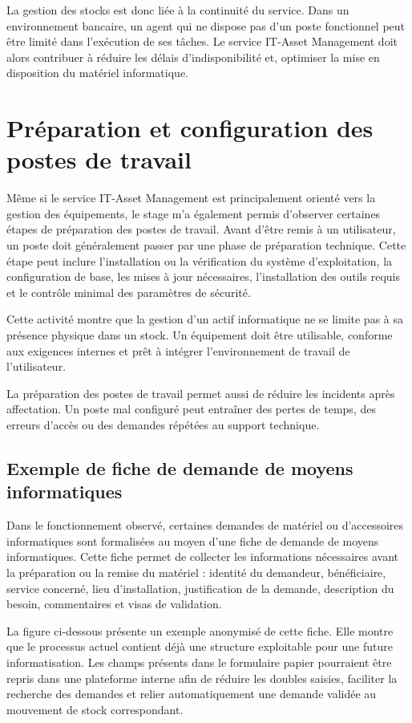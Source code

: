 \documentclass[12pt,a4paper]{report}
\begin{document}
La gestion des stocks est donc liée à la continuité du service. Dans un environnement bancaire, un agent qui ne dispose pas d'un poste fonctionnel peut être limité dans l'exécution de ses tâches. Le service IT-Asset Management doit alors contribuer à réduire les délais d'indisponibilité et, optimiser la mise en disposition du matériel informatique.



\section{Préparation et configuration des postes de travail}

Même si le service IT-Asset Management est principalement orienté vers la gestion des équipements, le stage m'a également permis d'observer certaines étapes de préparation des postes de travail.
Avant d'être remis à un utilisateur, un poste doit généralement passer par une phase de préparation technique. Cette étape peut inclure l'installation ou la vérification du système d'exploitation, la configuration de base, les mises à jour nécessaires, l'installation des outils requis et le contrôle minimal des paramètres de sécurité.

Cette activité montre que la gestion d'un actif informatique ne se limite pas à sa présence physique dans un stock. Un équipement doit être utilisable, conforme aux exigences internes et prêt à intégrer l'environnement de travail de l'utilisateur.

La préparation des postes de travail permet aussi de réduire les incidents après affectation. Un poste mal configuré peut entraîner des pertes de temps, des erreurs d'accès ou des demandes répétées au support technique.

\subsection{Exemple de fiche de demande de moyens informatiques}

Dans le fonctionnement observé, certaines demandes de matériel ou d'accessoires informatiques sont formalisées au moyen d'une fiche de demande de moyens informatiques. Cette fiche permet de collecter les informations nécessaires avant la préparation ou la remise du matériel : identité du demandeur, bénéficiaire, service concerné, lieu d'installation, justification de la demande, description du besoin, commentaires et visas de validation.

La figure ci-dessous présente un exemple anonymisé de cette fiche. Elle montre que le processus actuel contient déjà une structure exploitable pour une future informatisation. Les champs présents dans le formulaire papier pourraient être repris dans une plateforme interne afin de réduire les doubles saisies, faciliter la recherche des demandes et relier automatiquement une demande validée au mouvement de stock correspondant.
\end{document}
